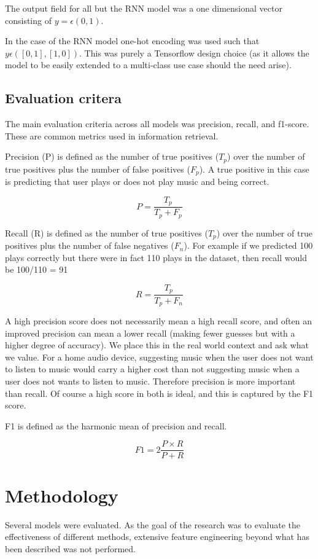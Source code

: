 The output field for all but the RNN model was a one dimensional vector consisting of $y = \epsilon (0,1)$.

In the case of the RNN model one-hot encoding was used such that $y \epsilon ([0,1],[1,0])$. This was purely a Tensorflow design choice (as it allows the model to be easily extended to a multi-class use case should the need arise).

\section{Evaluation critera}

The main evaluation criteria across all models was precision, recall, and f1-score. These are common metrics used in information retrieval. 

Precision (P) is defined as the number of true positives  ($T_p$) over the number of true positives plus the number of false positives ($F_p$). A true positive in this case is predicting that user plays or does not play music and being correct.

$$P = \frac{T_p}{T_p+F_p}$$

Recall (R) is defined as the number of true positives ($T_p$) over the number of true positives plus the number of false negatives ($F_n$). For example if we predicted 100 plays correctly but there were in fact 110 plays in the dataset, then recall would be 100/110 = 91%

$$R = \frac{T_p}{T_p + F_n}$$

A high precision score does not necessarily mean a high recall score, and often an improved precision can mean a lower recall (making fewer guesses but with a higher degree of accuracy). We place this in the real world context and ask what we value. For a home audio device, suggesting music when the user does not want to listen to music would carry a higher cost than not suggesting music when a user does not wants to listen to music. Therefore precision is more important than recall. Of course a high score in both is ideal, and this is captured by the F1 score.

F1 is defined as the harmonic mean of precision and recall.

$$F1 = 2\frac{P \times R}{P+R}$$

\chapter{Methodology} %

Several models were evaluated. As the goal of the research was to evaluate the effectiveness of different methods, extensive feature engineering beyond what has been described was not performed. 

